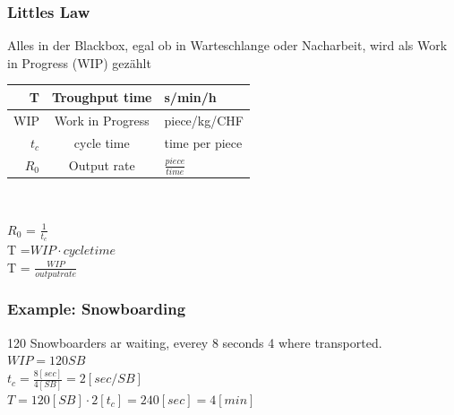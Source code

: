 \subsubsection{Little\textquotesingle{}s Law}\label{littleslaw}
\begin{center}
	Alles in der Blackbox, egal ob in Warteschlange oder Nacharbeit, wird als Work in Progress (WIP) gez\"ahlt\\
	\begin{tabular}{|r|c|l|}
	\hline T  & Troughput time & s/min/h \\ 
	\hline WIP & Work in Progress & piece/kg/CHF \\ 
	\hline $t_c$ & cycle time & time per piece\\ 
	\hline $R_0$ & Output rate & $\frac{piece}{time}$\\
	\hline
\end{tabular}
\\\vspace{5 mm}

	$R_0$ = $\frac{1}{t_c}$ \\\vspace{2 mm}
	T =$ WIP\cdot cycle time$ \\\vspace{2 mm}
	T = $\frac{WIP}{output rate}$\\\vspace{2 mm}

\end{center}
\subsubsection{Example: Snowboarding}
\begin{center}
	120 Snowboarders ar waiting, everey 8 seconds 4 where transported.\\\vspace{2 mm}
$WIP = 120 SB $\\\vspace{2 mm}
$t_c = \frac{8 [sec]}{4[SB]} = 2[sec/SB]$ \\\vspace{2 mm}
$T = 120 [SB] \cdot 2[t_c] = 240 [sec] = 4 [min] $ \\\vspace{2 mm}
\end{center}
